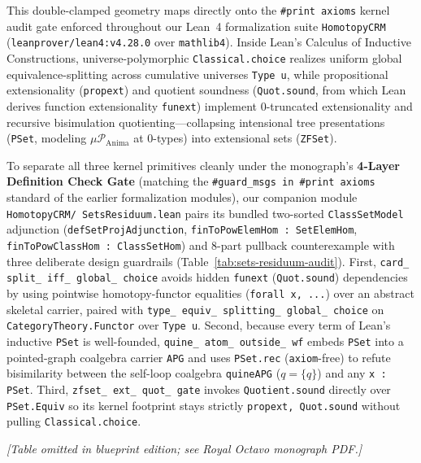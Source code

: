 This double-clamped geometry maps directly onto the \texttt{\#print axioms} kernel audit gate enforced throughout our Lean~4 formalization suite \texttt{HomotopyCRM} (\texttt{leanprover/lean4:v4.28.0} over \texttt{mathlib4}). Inside Lean's Calculus of Inductive Constructions, universe-polymorphic \texttt{Classical.choice} realizes uniform global equivalence-splitting across cumulative universes \texttt{Type u}, while propositional extensionality (\texttt{propext}) and quotient soundness (\texttt{Quot.sound}, from which Lean derives function extensionality \texttt{funext}) implement $0$-truncated extensionality and recursive bisimulation quotienting---collapsing intensional tree presentations (\texttt{PSet}, modeling $\mu \mathcal{P}_{\mathrm{Anima}}$ at $0$-types) into extensional sets (\texttt{ZFSet}).

To separate all three kernel primitives cleanly under the monograph's \textbf{4-Layer Definition Check Gate} (matching the \texttt{\#guard\_msgs in \#print axioms} standard of the earlier formalization modules), our companion module \texttt{HomotopyCRM/ SetsResiduum.lean} pairs its bundled two-sorted \texttt{ClassSetModel} adjunction (\texttt{defSetProjAdjunction}, \texttt{finToPowElemHom : SetElemHom}, \texttt{finToPowClassHom : ClassSetHom}) and $8$-part pullback counterexample with three deliberate design guardrails (Table~\ref{tab:sets-residuum-audit}). First, \texttt{card\_ split\_ iff\_ global\_ choice} avoids hidden \texttt{funext} (\texttt{Quot.sound}) dependencies by using pointwise homotopy-functor equalities (\texttt{forall x, ...}) over an abstract skeletal carrier, paired with \texttt{type\_ equiv\_ splitting\_ global\_ choice} on \texttt{CategoryTheory.Functor} over \texttt{Type u}. Second, because every term of Lean's inductive \texttt{PSet} is well-founded, \texttt{quine\_ atom\_ outside\_ wf} embeds \texttt{PSet} into a pointed-graph coalgebra carrier \texttt{APG} and uses \texttt{PSet.rec} (\texttt{axiom}-free) to refute bisimilarity between the self-loop coalgebra \texttt{quineAPG} ($q = \{q\}$) and any \texttt{x : PSet}. Third, \texttt{zfset\_ ext\_ quot\_ gate} invokes \texttt{Quotient.sound} directly over \texttt{PSet.Equiv} so its kernel footprint stays strictly \texttt{propext, Quot.sound} without pulling \texttt{Classical.choice}.

\begin{center}\emph{[Table omitted in blueprint edition; see Royal Octavo monograph PDF.]}\label{tab:sets-residuum-audit}\end{center}

